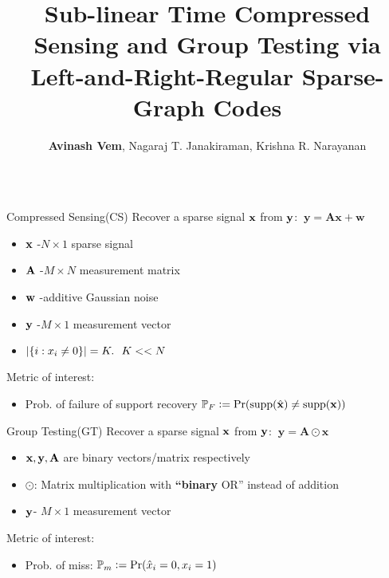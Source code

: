\documentclass[final]{beamer}
\title{Sub-linear Time Compressed Sensing and Group Testing via Left-and-Right-Regular Sparse-Graph Codes}
\author{\textbf{Avinash Vem}, Nagaraj T. Janakiraman, Krishna R. Narayanan}
\institute{ECE Dept.,Texas A\&M University}
\newlength{\onecolwid}
\newlength{\blockskip}
\newlength{\paraskip}
\newlength{\negativeskip}
\begin{document}
\begin{frame}
\begin{columns}[t]
  \begin{column}{\onecolwid}
\vspace{\negativeskip}
  \begin{block}{\Large Compressed Sensing(CS)}
Recover a sparse signal $\mathbf{x}$ from $\mathbf{y}$:  $~\mathbf{y=Ax +w}$
	 \begin{itemize}
		\item $\mathbf{x}$ -$N \times 1$ sparse signal
		\item $\mathbf{A}$ -$M \times N$ measurement matrix
		\item $\mathbf{w}$ -additive Gaussian noise
		\item $\mathbf{y}$ -$M \times 1$ measurement vector
		\item $\lvert{\{i: x_i\neq 0\}}\rvert=K. ~~ K<<N$
	\end{itemize}
	\vspace{\paraskip}

Metric of interest:
		\begin{itemize}
			\item Prob. of failure of support recovery $\mathbb{P}_{F}\mathrel{\mathop:}= \text{Pr}(\text{supp}(\hat{\mathbf{x}})\neq \text{supp}(\mathbf{x}))$
		\end{itemize}     
    \end{block}
\vspace{\blockskip}    

\begin{block}{\Large Group Testing(GT)}
	Recover a sparse signal $\mathbf{x}$ from $\mathbf{y}$:  $~\mathbf{y=A\odot x}$
	 \begin{itemize}
		\item $\mathbf{x, y, A}$ are binary vectors/matrix respectively
		\item $\odot$: Matrix multiplication with \textbf{``binary} OR'' instead of addition
		\item $\mathbf{y}$- $M \times 1$ measurement vector
	\end{itemize}
	\vspace{\paraskip}
	
Metric of interest:   
    \begin{itemize}
 		\item Prob. of miss: $\mathbb{P}_{m}\mathrel{\mathop:}= \text{Pr}(\hat{x}_i=0, x_i=1)$
	\end{itemize}     
	
 \end{block}


\end{column}
\end{columns}
\end{frame}
\end{document}
